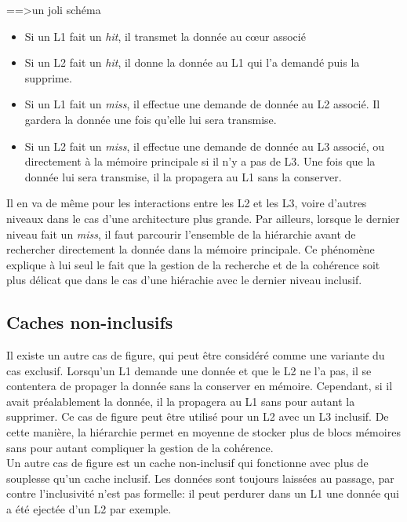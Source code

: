 ==>un joli schéma\\
\begin{itemize}
\item Si un L1 fait un \textit{hit}, il transmet la donnée au c{\oe}ur associé
\item Si un L2 fait un \textit{hit}, il donne la donnée au L1 qui l'a demandé puis la supprime.
\item Si un L1 fait un \textit{miss}, il effectue une demande de donnée au L2 associé. Il gardera la donnée une fois qu'elle lui sera transmise.
\item Si un L2 fait un \textit{miss}, il effectue une demande de donnée au L3 associé, ou directement à la mémoire principale si il n'y a pas de L3. Une fois que la donnée lui sera transmise, il la propagera au L1 sans la conserver. \\
\end{itemize}

Il en va de même pour les interactions entre les L2 et les L3, voire d'autres niveaux dans le cas d'une architecture plus grande. Par ailleurs, lorsque le dernier niveau fait un \textit{miss}, il faut parcourir l'ensemble de la hiérarchie avant de rechercher directement la donnée dans la mémoire principale. Ce phénomène explique à lui seul le fait que la gestion de la recherche et de la cohérence soit plus délicat que dans le cas d'une hiérachie avec le dernier niveau inclusif.

\subsection{Caches non-inclusifs}
Il existe un autre cas de figure, qui peut être considéré comme une variante du cas exclusif. Lorsqu'un L1 demande une donnée et que le L2 ne l'a pas, il se contentera de propager la donnée sans la conserver en mémoire. Cependant, si il avait préalablement la donnée, il la propagera au L1 sans pour autant la supprimer. Ce cas de figure peut être utilisé pour un L2 avec un L3 inclusif. De cette manière, la hiérarchie permet en moyenne de stocker plus de blocs mémoires sans pour autant compliquer la gestion de la cohérence. \\

Un autre cas de figure est un cache non-inclusif qui fonctionne avec plus de souplesse qu'un cache inclusif. Les données sont toujours laissées au passage, par contre l'inclusivité n'est pas formelle: il peut perdurer dans un L1 une donnée qui a été ejectée d'un L2 par exemple.

